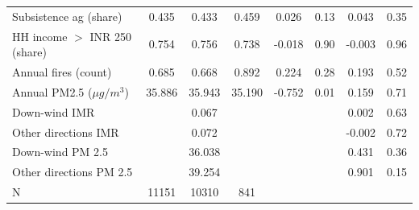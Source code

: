 \begin{center}
{\begin{tabular}{l c c c c c c c}
Subsistence ag (share)             & 0.435 & 0.433 & 0.459 & 0.026 & 0.13 & 0.043 & 0.35 \\
HH income $>$ INR 250 (share)      & 0.754          & 0.756          & 0.738          & -0.018           & 0.90   & -0.003 & 0.96       \\
Annual fires (count)      & 0.685          & 0.668          & 0.892          & 0.224                 & 0.28    & 0.193 & 0.52        \\
Annual PM2.5 ($\mu g/m^{3}$)      & 35.886          & 35.943          & 35.190          & -0.752               & 0.01   & 0.159 & 0.71       \\
Down-wind IMR     &           & 0.067          &        &           &      & 0.002          & 0.63          \\
Other directions IMR     &          & 0.072          &           &     &       & -0.002          & 0.72          \\
Down-wind PM 2.5    &          & 36.038          &           &      &         & 0.431          & 0.36          \\
Other directions PM 2.5    &          & 39.254          &       &          &       & 0.901          & 0.15          \\
\hline
N       & 11151        & 10310       & 841          &             &    &   &           \\
\hline 
\end{tabular} }  
\end{center}
